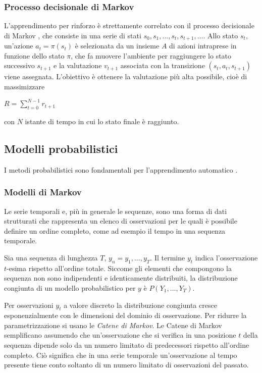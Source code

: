 \documentclass[../main.tex]{subfiles}
\begin{document}
\subsubsection{Processo decisionale di Markov}
L'apprendimento per rinforzo è strettamente correlato con il processo decisionale di Markov \cite{compIntelligence}, che consiste in una serie di stati $s _ { 0 } , s _ { 1 } , \ldots , s _ { t } , s _ { t + 1 } , \ldots$. Allo stato ${ s } _ { t }$, un'azione $a _ { t } = \pi \left( s _ { t } \right)$ è selezionata da un insieme $A$ di azioni intraprese in funzione dello stato $\pi$, che fa muovere l'ambiente per raggiungere lo stato successivo $s _ { t  + 1}$ e la valutazione $v _ {t + 1}$ associata con la transizione $\left( s _ { t } , a _ { t } , s _ { t + 1 } \right)$ viene assegnata. L'obiettivo è ottenere la valutazione più alta possibile, cioè di massimizzare 

\begin{center}
				\begin{math}
								R = \sum _ { t = 0 } ^ { N - 1 } r _ { t + 1 }
				\end{math}
\end{center}

con $N$ istante di tempo in cui lo stato finale è raggiunto.

\subsection{Modelli probabilistici}
I metodi probabilistici sono fondamentali per l'apprendimento automatico \cite{compIntelligence}.

\subsubsection{Modelli di Markov}
Le serie temporali e, più in generale le sequenze, sono una forma di dati strutturati che rappresenta un elenco di osservazioni per le quali è possibile definire un ordine completo, come ad esempio il tempo in una sequenza temporale.

Sia una sequenza di lunghezza $T$, $ { y } _ { n } = y _ { 1 } , \dots , y _ { T }$. Il termine ${y} _ {t}$ indica l'osservazione $t$-esima rispetto all'ordine totale. Siccome gli elementi che compongono la sequenza non sono indipendenti e identicamente distribuiti, la distribuzione congiunta di un modello probabilistico per $y$ è $P \left( Y _ { 1 } , \ldots , Y _ { T } \right)$.

Per osservazioni ${y} _ {t}$ a valore discreto la distribuzione congiunta cresce esponenzialmente con le dimensioni del dominio di osservazione. Per ridurre la parametrizzazione si usano le \textit{Catene di Markov}. Le Catene di Markov semplificano assumendo che un'osservazione che si verifica in una posizione $t$ della sequenza dipende solo da un numero limitato di predecessori rispetto all'ordine completo.
Ciò significa che in una serie temporale un'osservazione al tempo presente tiene conto soltanto di un numero limitato di osservazioni del passato.
\end{document}
